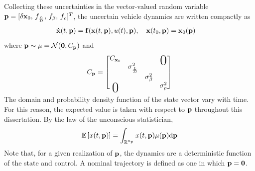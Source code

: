Collecting these uncertainties in the vector-valued random variable $\mathbf{p} = [\delta\mathbf{x}_0,\, f_{\frac{L}{D}},\, f_{\beta},\, f_{\rho}]^T$, the uncertain vehicle dynamics are written compactly as
\begin{align}
	\dot{\mathbf{x}}(t,\mathbf{p}) &= \mathbf{f}(\mathbf{x}(t,\mathbf{p}), u(t), \mathbf{p}),\quad
		\mathbf{x}(t_0,\mathbf{p}) = \mathbf{x}_0(\mathbf{p}) \label{Eq:UncertainDynamics}
\end{align}
where $\mathbf{p} \sim \mu = \mathcal{N}(\mathbf{0},C_{\mathbf{p}})$ and 
\begin{align}
	\cov_{\param} = \begin{bmatrix}
		\cov_{\state_0} & & &\bigzero \\ 
		 &\sigma^2_{\frac{L}{D}} \\
		 & & \sigma^2_{\beta} \\
		\bigzero & & & \sigma^2_{\rho}
	\end{bmatrix}
\end{align}
The domain and probability density function of the state vector vary with time. For this reason, the expected value is taken with respect to $\mathbf{p}$ throughout this dissertation. By the law of the unconscious statistician, 
\begin{align}
	\mathbb{E}\left[x(t,\mathbf{p})\right] = \int_{\mathbb{R}^{n_p}}x(t,\mathbf{p})\mu(\mathbf{p})\mathrm{d}\mathbf{p}
\end{align}
Note that, for a given realization of $\mathbf{p}$, the dynamics are a deterministic function of the state and control. A nominal trajectory is defined as one in which $\mathbf{p}=\mathbf{0}$.

